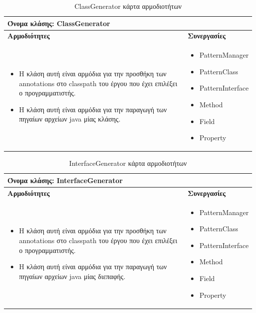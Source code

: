 \begin{table}[H]
    \centering
    \begin{tabular}{|p{5cm}|p{5cm}|}
        \hline
        \multicolumn{2}{|l|}{Όνομα κλάσης: ClassGenerator} \\
        \hline
        \textbf{Αρμοδιότητες} & \textbf{Συνεργασίες} \\
        \hline
        \begin{itemize}
            \item Η κλάση αυτή είναι αρμόδια για την προσθήκη των annotations στο classpath του έργου που έχει επιλέξει ο προγραμματιστής.
            \item Η κλάση αυτή είναι αρμόδια για την παραγωγή των πηγαίων αρχείων java μίας κλάσης.
        \end{itemize} &   
        \begin{itemize}
            \item PatternManager
            \item PatternClass
            \item PatternInterface
            \item Method
            \item Field
            \item Property
        \end{itemize} \\
        \hline
    \end{tabular}
    \label{tab:ClassGeneratorCRC}
    \caption{ClassGenerator κάρτα αρμοδιοτήτων}
\end{table}
\begin{table}[H]
    \centering
    \begin{tabular}{|p{5cm}|p{5cm}|}
        \hline
        \multicolumn{2}{|l|}{Όνομα κλάσης: InterfaceGenerator} \\
        \hline
        \textbf{Αρμοδιότητες} & \textbf{Συνεργασίες} \\
        \hline
        \begin{itemize}
            \item Η κλάση αυτή είναι αρμόδια για την προσθήκη των annotations στο classpath του έργου που έχει επιλέξει ο προγραμματιστής.
            \item Η κλάση αυτή είναι αρμόδια για την παραγωγή των πηγαίων αρχείων java μίας διεπαφής.
        \end{itemize} &   
        \begin{itemize}
            \item PatternManager
            \item PatternClass
            \item PatternInterface
            \item Method
            \item Field
            \item Property
        \end{itemize} \\
        \hline
    \end{tabular}
    \label{tab:InterfaceGeneratorCRC}
    \caption{InterfaceGenerator κάρτα αρμοδιοτήτων}
\end{table}